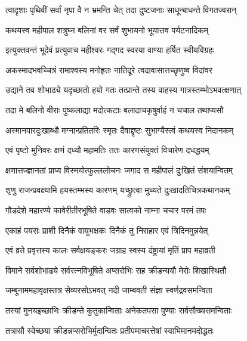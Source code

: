 \twolineshloka
{त्वादृशाः पृथिवीं सर्वां नृपा वै न भ्रमन्ति चेत्}
{तदा दुष्टजनाः साधून्बाधन्ते विगतज्वरान्}%

\twolineshloka
{कथयस्व महीपाल शत्रुघ्न बलिनां वर}
{सर्वं शुभायनो भूयात्तव पर्यटनादिकम्}%


\twolineshloka
{इत्युक्तवन्तं भूदेवं प्रत्युवाच महीश्वरः}
{गद्गद स्वरया वाण्या हर्षित स्वीयविग्रहः}%


\twolineshloka
{अकस्मादभवच्चित्रं रामाश्वस्य मनोहृतः}
{नातिदूरे त्वदावासात्तच्छृणुष्व विदांवर}%

\twolineshloka
{उद्याने तव शोभाढ्ये यदृच्छातो हयो गतः}
{तत्प्रान्ते तस्य वाहस्य गात्रस्तम्भोऽभवत्क्षणात्}%

\twolineshloka
{तदा मे बलिनो वीराः पुष्कलाद्या मदोत्कटाः}
{बलादाचकृषुर्वाहं न चचाल तथाप्यसौ}%

\twolineshloka
{अस्मानपारदुःखाब्धौ मग्नान्प्रतितरिः स्मृतः}
{दैवाद्दृष्टः सुभाग्यैस्त्वं कथयस्व निदानकम्}%


\twolineshloka
{एवं पृष्टो मुनिवरः क्षणं दध्यौ महामतिः}
{ततः कारणसंयुक्तं विचारेण दधद्धयम्}%

\twolineshloka
{क्षणात्तज्ज्ञानतां प्राप्य विस्मयोत्फुल्ललोचनः}
{जगाद स महीपालं दुःखितं संशयान्वितम्}%


\twolineshloka
{शृणु राजन्प्रवक्ष्यामि हयस्तम्भस्य कारणम्}
{यच्छ्रुत्वा मुच्यते दुःखादतिचित्रकथानकम्}%

\twolineshloka
{गौडदेशे महारण्ये कावेरीतीरभूषिते}
{वाडवः सात्वको नाम्ना चचार परमं तपः}%

\twolineshloka
{एकाहं पयसः प्राशी दिनैकं वायुभक्षकः}
{दिनैकं तु निराहार एवं त्रिदिनमुन्नयेत्}%

\twolineshloka
{एवं व्रते प्रवृत्तस्य कालः सर्वक्षयङ्करः}
{जग्राह स्वस्य दंष्ट्रायां मृतिं प्राप महाव्रती}%

\twolineshloka
{विमाने सर्वशोभाढ्ये सर्वरत्नविभूषिते}
{अप्सरोभिः सह क्रीडन्ययौ मेरोः शिखास्थितौ}%

\twolineshloka
{जम्बूनाममहावृक्षस्तत्र सेव्यरसोऽभवत्}
{नदी जाम्बवती संज्ञा स्वर्णद्रवसमन्विता}%

\twolineshloka
{तस्यां मुनयइच्छाभिः क्रीडन्ते कुतुकान्विताः}
{अनेकतपसा पुण्याः सर्वसौख्यसमन्विताः}%

\twolineshloka
{तत्रासौ स्वेच्छया क्रीडन्नप्सरोभिर्मुदान्वितः}
{प्रतीपमाचरत्तेषां स्वाभिमानमदोद्धतः}%

